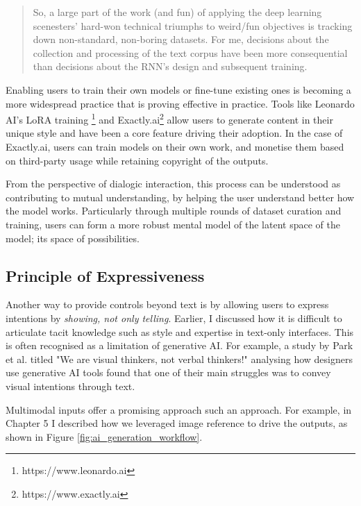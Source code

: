 \begin{quote}
So, a large part of the work (and fun) of applying the deep learning scenesters' hard-won technical triumphs to weird/fun objectives is tracking down non-standard, non-boring datasets. For me, decisions about the collection and processing of the text corpus have been more consequential than decisions about the RNN's design and subsequent training.
\end{quote}

Enabling users to train their own models or fine-tune existing ones is becoming a more widespread practice that is proving effective in practice. Tools like Leonardo AI's LoRA training \footnote{https://www.leonardo.ai} and Exactly.ai\footnote{https://www.exactly.ai} allow users to generate content in their unique style and have been a core feature driving their adoption. In the case of Exactly.ai, users can train models on their own work, and monetise them based on third-party usage while retaining copyright of the outputs.

From the perspective of dialogic interaction, this process can be understood as contributing to mutual understanding, by helping the user understand better how the model works. Particularly through multiple rounds of dataset curation and training, users can form a more robust mental model of the latent space of the model; its space of possibilities.

\subsection{Principle of Expressiveness}

Another way to provide controls beyond text is by allowing users to express intentions by \textit{showing, not only telling}. Earlier, I discussed how it is difficult to articulate tacit knowledge such as style and expertise in text-only interfaces. This is often recognised as a limitation of generative AI. For example, a study by Park et al. \cite{Park2024-gw} titled "We are visual thinkers, not verbal thinkers!" analysing how designers use generative AI tools found that one of their main struggles was to convey visual intentions through text.

Multimodal inputs offer a promising approach such an approach. For example, in Chapter 5 I described how we leveraged image reference to drive the outputs, as shown in Figure  \ref{fig:ai_generation_workflow}.



